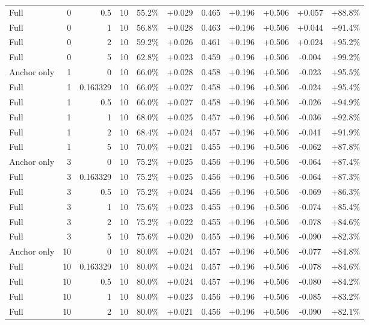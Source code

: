 \begin{table}[htbp]
\begin{tabular}{lrrrccccccc}
Full & 0 & 0.5 & 10 & 55.2\% & +0.029 & 0.465 & +0.196 & +0.506 & +0.057 & +88.8\% \\
Full & 0 & 1 & 10 & 56.8\% & +0.028 & 0.463 & +0.196 & +0.506 & +0.044 & +91.4\% \\
Full & 0 & 2 & 10 & 59.2\% & +0.026 & 0.461 & +0.196 & +0.506 & +0.024 & +95.2\% \\
Full & 0 & 5 & 10 & 62.8\% & +0.023 & 0.459 & +0.196 & +0.506 & -0.004 & +99.2\% \\
Anchor only & 1 & 0 & 10 & 66.0\% & +0.028 & 0.458 & +0.196 & +0.506 & -0.023 & +95.5\% \\
Full & 1 & 0.163329 & 10 & 66.0\% & +0.027 & 0.458 & +0.196 & +0.506 & -0.024 & +95.4\% \\
Full & 1 & 0.5 & 10 & 66.0\% & +0.027 & 0.458 & +0.196 & +0.506 & -0.026 & +94.9\% \\
Full & 1 & 1 & 10 & 68.0\% & +0.025 & 0.457 & +0.196 & +0.506 & -0.036 & +92.8\% \\
Full & 1 & 2 & 10 & 68.4\% & +0.024 & 0.457 & +0.196 & +0.506 & -0.041 & +91.9\% \\
Full & 1 & 5 & 10 & 70.0\% & +0.021 & 0.455 & +0.196 & +0.506 & -0.062 & +87.8\% \\
Anchor only & 3 & 0 & 10 & 75.2\% & +0.025 & 0.456 & +0.196 & +0.506 & -0.064 & +87.4\% \\
Full & 3 & 0.163329 & 10 & 75.2\% & +0.025 & 0.456 & +0.196 & +0.506 & -0.064 & +87.3\% \\
Full & 3 & 0.5 & 10 & 75.2\% & +0.024 & 0.456 & +0.196 & +0.506 & -0.069 & +86.3\% \\
Full & 3 & 1 & 10 & 75.6\% & +0.023 & 0.455 & +0.196 & +0.506 & -0.074 & +85.4\% \\
Full & 3 & 2 & 10 & 75.2\% & +0.022 & 0.455 & +0.196 & +0.506 & -0.078 & +84.6\% \\
Full & 3 & 5 & 10 & 75.6\% & +0.020 & 0.455 & +0.196 & +0.506 & -0.090 & +82.3\% \\
Anchor only & 10 & 0 & 10 & 80.0\% & +0.024 & 0.457 & +0.196 & +0.506 & -0.077 & +84.8\% \\
Full & 10 & 0.163329 & 10 & 80.0\% & +0.024 & 0.457 & +0.196 & +0.506 & -0.078 & +84.6\% \\
Full & 10 & 0.5 & 10 & 80.0\% & +0.024 & 0.457 & +0.196 & +0.506 & -0.080 & +84.2\% \\
Full & 10 & 1 & 10 & 80.0\% & +0.023 & 0.456 & +0.196 & +0.506 & -0.085 & +83.2\% \\
Full & 10 & 2 & 10 & 80.0\% & +0.021 & 0.456 & +0.196 & +0.506 & -0.090 & +82.1\% \\

\end{tabular}
\end{table}
